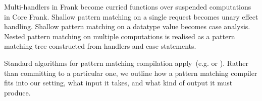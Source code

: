


Multi-handlers in Frank become curried functions over suspended
computations in Core Frank.
%
Shallow pattern matching on a single request becomes unary effect
handling. Shallow pattern matching on a datatype value becomes case
analysis. Nested pattern matching on multiple computations is realised
as a pattern matching tree constructed from handlers and case
statements. 

Standard algorithms for pattern matching compilation
apply~(e.g. \cite{Augustsson85} or \cite{Maranget08}). Rather than
committing to a particular one, we outline how a pattern matching
compiler fits into our setting, what input it takes, and what kind of
output it must produce.

